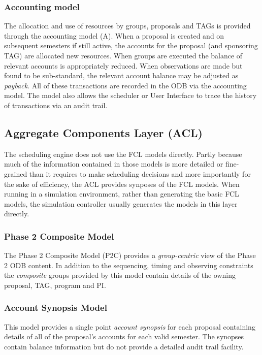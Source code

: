\subsubsection{Accounting model}
The allocation and use of resources by groups, proposals and TAGs is provided through the accounting model (A). When a proposal is created and on subsequent semesters if still active, the accounts for the proposal (and sponsoring TAG) are allocated new resources. When groups are executed the balance of relevant accounts is appropriately reduced. When observations are made but found to be sub-standard, the relevant account balance may be adjusted as \emph{payback}. All of these transactions are recorded in the ODB via the accounting model. The model also allows the scheduler or User Interface to trace the history of transactions via an audit trail.

\subsection{Aggregate Components Layer (ACL)}
The scheduling engine does not use the FCL models directly. Partly because much of the information contained in those models is more detailed or fine-grained than it requires to make scheduling decisions and more importantly for the sake of efficiency, the ACL provides synposes of the FCL models. When running in a simulation environment, rather than generating the basic FCL models, the simulation controller usually generates the models in this layer directly.

\subsubsection{Phase 2 Composite Model}
The Phase 2 Composite Model (P2C) provides a \emph{group-centric} view of the Phase 2 ODB content. In addition to the sequencing, timing and observing constraints the \emph{composite} groups provided by this model contain details of the owning proposal, TAG, program and PI. 

\subsubsection{Account Synopsis Model}
This model provides a single point \emph{account synopsis} for each proposal containing details of all of the proposal's accounts for each valid semester. The synopses contain balance information but do not provide a detailed audit trail facility.

